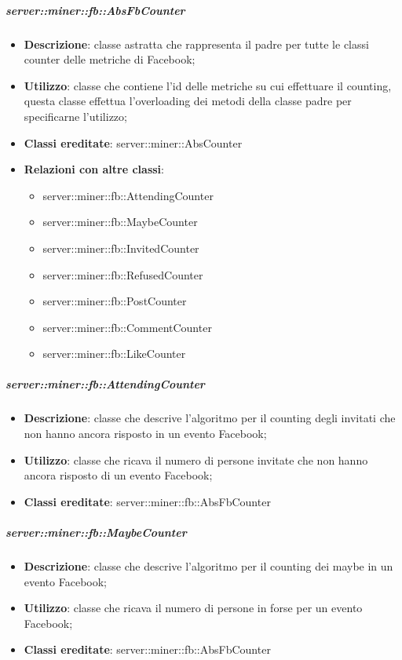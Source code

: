 		\subparagraph{server::miner::fb::AbsFbCounter} %
		\label{subp:server_miner_fb_AbsFbCounter}
			\begin{itemize}
				\item \textbf{Descrizione}: classe astratta che rappresenta il padre per tutte le classi counter delle metriche di Facebook;
				\item \textbf{Utilizzo}: classe che contiene l'id delle metriche su cui effettuare il counting, questa classe effettua l'overloading dei metodi della classe padre per specificarne l'utilizzo;
				\item \textbf{Classi ereditate}: server::miner::AbsCounter
				\item \textbf{Relazioni con altre classi}:
					\begin{itemize}
						\item server::miner::fb::AttendingCounter
						\item server::miner::fb::MaybeCounter
						\item server::miner::fb::InvitedCounter
						\item server::miner::fb::RefusedCounter
						\item server::miner::fb::PostCounter
						\item server::miner::fb::CommentCounter
						\item server::miner::fb::LikeCounter
					\end{itemize}
			\end{itemize}

		\subparagraph{server::miner::fb::AttendingCounter} %
		\label{subp:server_miner_fb_AttendingCounter}
			\begin{itemize}
				\item \textbf{Descrizione}: classe che descrive l'algoritmo per il counting degli invitati che non hanno ancora risposto in un evento Facebook;
				\item \textbf{Utilizzo}: classe che ricava il numero di persone invitate che non hanno ancora risposto di un evento Facebook;
				\item \textbf{Classi ereditate}: server::miner::fb::AbsFbCounter
			\end{itemize}

		\subparagraph{server::miner::fb::MaybeCounter} %
		\label{subp:server_miner_fb_MaybeCounter}
			\begin{itemize}
				\item \textbf{Descrizione}: classe che descrive l'algoritmo per il counting dei maybe in un evento Facebook;
				\item \textbf{Utilizzo}: classe che ricava il numero di persone in forse per un evento Facebook;
				\item \textbf{Classi ereditate}: server::miner::fb::AbsFbCounter
			\end{itemize}

